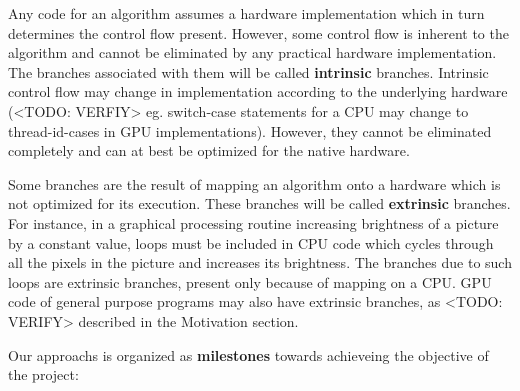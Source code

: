 
\par{
Any code for an algorithm assumes a hardware implementation which in turn determines the control flow present. However, some control flow is inherent to the algorithm and cannot be eliminated by any practical hardware implementation. The branches associated with them will be called \textbf{intrinsic} branches. Intrinsic control flow may change in implementation according to the underlying hardware (<TODO: VERFIY> eg. switch-case statements for a CPU may change to thread-id-cases in GPU implementations). However, they cannot be eliminated completely and can at best be optimized for the native hardware.
}

\par{
Some branches are the result of mapping an algorithm onto a hardware which is not optimized for its execution. These branches will be called \textbf{extrinsic} branches. For instance, in a graphical processing routine increasing brightness of a picture by a constant value, loops must be included in CPU code which cycles through all the pixels in the picture and increases its brightness. The branches due to such loops are extrinsic branches, present only because of mapping on a CPU. GPU code of general purpose programs may also have extrinsic branches, as <TODO: VERIFY> described in the Motivation section.  
} 

\par{Our approachs is organized as \textbf{milestones} towards achieveing the objective of the project:}

